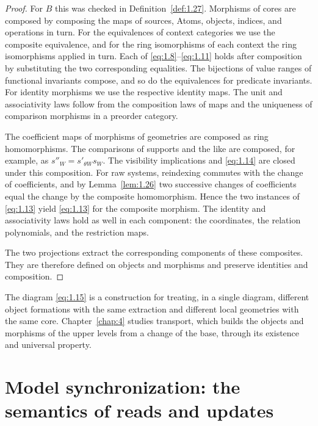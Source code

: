 \begin{proof}

For $B$ this was checked in Definition~\ref{def:1.27}.
Morphisms of cores are composed by composing the maps of sources, Atoms,
objects, indices, and operations in turn.
For the equivalences of context categories we use the composite equivalence,
and for the ring isomorphisms of each context the ring isomorphisms applied in
turn.
Each of \eqref{eq:1.8}--\eqref{eq:1.11} holds after composition by substituting
the two corresponding equalities.
The bijections of value ranges of functional invariants compose, and so do the
equivalences for predicate invariants.
For identity morphisms we use the respective identity maps.
The unit and associativity laws follow from the composition laws of maps and
the uniqueness of comparison morphisms in a preorder category.

The coefficient maps of morphisms of geometries are composed as ring
homomorphisms.
The comparisons of supports and the like are composed, for example, as
$s''_W=s'_{\theta W}s_W$.
The visibility implications and \eqref{eq:1.14} are closed under this
composition.
For raw systems, reindexing commutes with the change of coefficients, and by
Lemma~\ref{lem:1.26} two successive changes of coefficients equal the change by
the composite homomorphism.
Hence the two instances of \eqref{eq:1.13} yield \eqref{eq:1.13} for the
composite morphism.
The identity and associativity laws hold as well in each component: the
coordinates, the relation polynomials, and the restriction maps.

The two projections extract the corresponding components of these composites.
They are therefore defined on objects and morphisms and preserve identities
and composition.

\end{proof}

The diagram \eqref{eq:1.15} is a construction for treating, in a single
diagram, different object formations with the same extraction and different
local geometries with the same core.
Chapter~\ref{chap:4} studies transport, which builds the objects and morphisms
of the upper levels from a change of the base, through its existence and
universal property.

\section{Model synchronization: the semantics of reads and updates}\label{sec:1.8}

